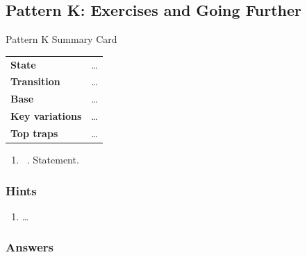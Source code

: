 \subsection{Pattern K: Exercises and Going Further}
\label{ssec:chN-pK-ex}

\begin{patternbox}{Pattern K Summary Card}
\begin{tabularx}{\linewidth}{@{}>{\bfseries}l X@{}}
State & \ldots \\
Transition & \ldots \\
Base & \ldots \\
Key variations & \ldots \\
Top traps & \ldots \\
\end{tabularx}
\end{patternbox}

\exlegend
\begin{enumerate}[leftmargin=*, label=\textbf{EK.\arabic*}, itemsep=6pt]
    \item \exeasy\ . Statement.  %
\end{enumerate}

\subsubsection*{Hints}
\begin{enumerate}[leftmargin=*, label=\textbf{EK.\arabic*}]
    \item \ldots
\end{enumerate}

\subsubsection*{Answers}
\begin{solutionbox}[EK.1]
\end{solutionbox}

